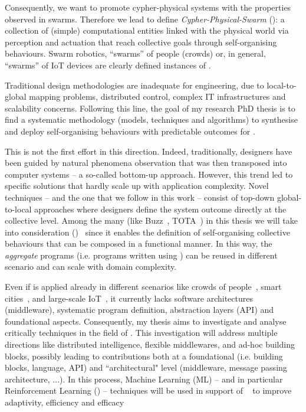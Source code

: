 \documentclass[11pt]{article}
\begin{document}
Consequently, we want to promote cypher-physical systems with the properties observed in swarms. 
%
Therefore we lead to define \textit{Cypher-Physical-Swarm} (\cpsw{}): a collection of (simple) computational entities linked with the physical world via perception and actuation that reach collective goals through self-organising behaviours.
%
Swarm robotics, ``swarms” of people (crowds) or, in general, ``swarms” of IoT devices are clearly defined instances of \cpsw{}.

Traditional design methodologies are inadequate for \cpsw{} engineering, due to local-to-global mapping problems, distributed control, complex IT infrastructures and scalability concerns.
%
Following this line, the goal of my research PhD thesis is to find a systematic methodology (models, techniques and algorithms) to synthesise and deploy self-organising behaviours with predictable outcomes for \cpsw{}.

This is not the first effort in this direction. Indeed, traditionally, designers have been guided
by natural phenomena observation that was then transposed into computer systems -- a so-called
bottom-up approach. However, this trend led to specific solutions that hardly scale up with application complexity.
%
Novel techniques -- and the one that we follow in this work -- consist of top-down global-to-local approaches where designers define the system outcome directly at the collective level.
%
Among the many (like Buzz~\cite{DBLP:journals/software/PinciroliB16}, TOTA~\cite{DBLP:conf/icdcsw/MameiZL03}) in this thesis we will take into consideration \textit{\acfull{}} (\ac{})~\cite{DBLP:journals/computer/BealPV15} since it enables the definition of self-organising collective behaviours that can be composed in a functional manner. In this way, the \textit{aggregate} programs (i.e. programs written using \ac{}) can be reused in different scenario and can scale with domain complexity. 

Even if \ac{} is applied already in different scenarios like crowds of people~\cite{DBLP:journals/computer/BealPV15}, smart cities~\cite{DBLP:journals/isci/CasadeiFPRSV19}, and large-scale IoT~\cite{DBLP:journals/fgcs/CasadeiFPRSV19}, it currently lacks software architectures (middleware), systematic program definition, abstraction layers (API) and foundational aspects.
%
Consequently, my thesis aims to investigate and analyse critically \acfull{} techniques in the field of \cpsw{}.
%
This investigation will address multiple directions like distributed intelligence, flexible middlewares, and ad-hoc building blocks, possibly leading to contributions both at a foundational (i.e. building blocks, \ac{} language, API) and ``architectural" level (middleware, message passing architecture, ...).
%
In this process, Machine Learning (ML) -- and in particular Reinforcement Learning (\rl{}) -- techniques will be used in support of \acfull{}~\cite{research} to improve adaptivity, efficiency and efficacy
\end{document}

